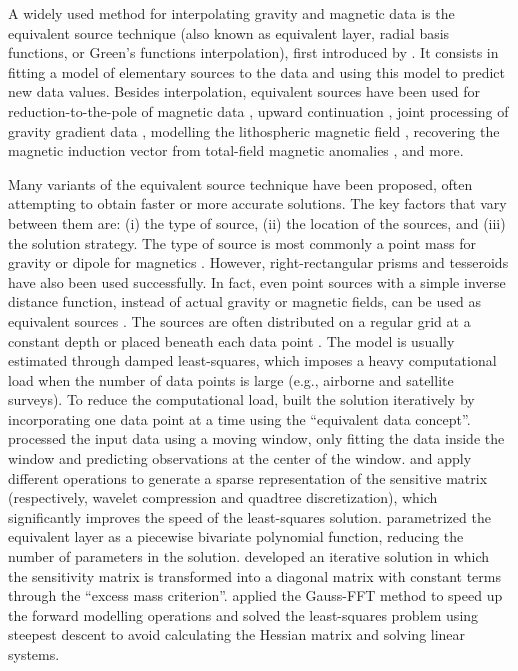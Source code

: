 \documentclass[twocolumn]{article}
\begin{document}
A widely used method for interpolating gravity and magnetic data
is the equivalent source technique (also known as equivalent layer, radial
basis functions, or Green's functions interpolation), first introduced by
\citet{dampney1969}.
It consists in fitting a model of elementary sources to the data and using this
model to predict new data values.
Besides interpolation, equivalent sources have been used for
reduction-to-the-pole of magnetic data
\citep{silva1986, nakatsuka2006, guspi2009}, upward
continuation \citep{emilia1973, li2010}, joint processing of gravity gradient
data \citep{barnes2011}, modelling the lithospheric magnetic field
\citep{kother2015}, recovering the magnetic induction vector from
total-field magnetic anomalies \citep{li2020}, and more.

Many variants of the equivalent source technique have been proposed, often
attempting to obtain faster or more accurate solutions.
The key factors that vary between them are: (i) the type of source, (ii)
the location of the sources, and (iii) the solution strategy.
The type of source is most commonly a point mass for gravity or dipole for
magnetics \citep[e.g.,~][]{vonfrese1981, silva1986, mendonca1994, siqueira2017}.
However, right-rectangular prisms \citep[e.g.,][]{barnes2011, jirigalatu2019,
li2020} and tesseroids \citep{bouman2016} have also been used successfully.
In fact, even point sources with a simple inverse distance function, instead of
actual gravity or magnetic fields, can be used as
equivalent sources \citep{cordell1992}.
The sources are often distributed on a regular grid at a constant depth
\citep[e.g.,~][]{leao1989, barnes2011, oliveira2013}
or placed beneath each data point \citep[e.g.,~][]{cordell1992, siqueira2017}.
The model is usually estimated through damped least-squares, which imposes a
heavy computational load when the number of data points is large (e.g.,
airborne and satellite surveys).
To reduce the computational load, \citet{mendonca1994} built the solution
iteratively by incorporating one data point at a time using the ``equivalent
data concept''.
\citet{leao1989} processed the input data using a moving window, only fitting the
data inside the window and predicting observations at the center of the window.
\citet{li2010} and \citet{barnes2011} apply different operations to generate a
sparse representation of the sensitive matrix (respectively, wavelet
compression and quadtree discretization), which significantly improves the
speed of the least-squares solution.
\citet{oliveira2013} parametrized the equivalent layer as a piecewise bivariate
polynomial function, reducing the number of parameters in the solution.
\citet{siqueira2017} developed an iterative solution in which the sensitivity
matrix is transformed into a diagonal matrix with constant terms through the
``excess mass criterion''.
\citet{jirigalatu2019} applied the Gauss-FFT method to speed up the forward
modelling operations and solved the least-squares problem using steepest
descent to avoid calculating the Hessian matrix and solving linear systems.
\end{document}
